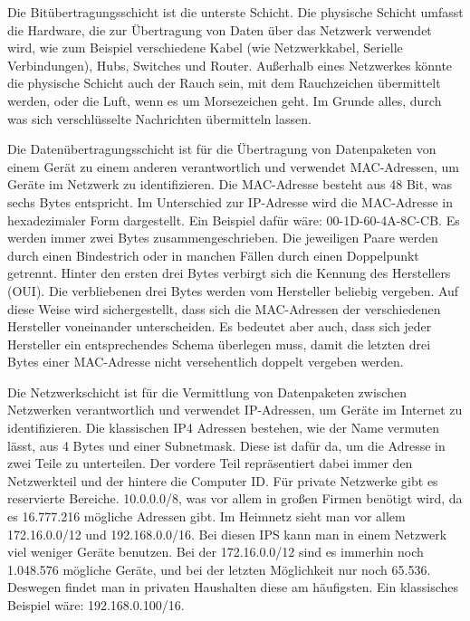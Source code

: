 \begin{compactenum} 
    \item Die Bitübertragungsschicht ist die unterste Schicht. Die physische Schicht umfasst die Hardware, die zur Übertragung von Daten über das Netzwerk verwendet wird, wie zum Beispiel verschiedene Kabel (wie Netzwerkkabel, Serielle Verbindungen), Hubs, Switches und Router. Außerhalb eines Netzwerkes könnte die physische Schicht auch der Rauch sein, mit dem Rauchzeichen übermittelt werden, oder die Luft, wenn es um Morsezeichen geht. Im Grunde alles, durch was sich verschlüsselte Nachrichten übermitteln lassen.  
    \item Die Datenübertragungsschicht ist für die Übertragung von Datenpaketen von einem Gerät zu einem anderen verantwortlich und verwendet MAC-Adressen, um Geräte im Netzwerk zu identifizieren. \cite{macAddress} Die MAC-Adresse besteht aus 48 Bit, was sechs Bytes entspricht. Im Unterschied zur IP-Adresse wird die MAC-Adresse in hexadezimaler Form dargestellt. Ein Beispiel dafür wäre: 00-1D-60-4A-8C-CB. Es werden immer zwei Bytes zusammengeschrieben. Die jeweiligen Paare werden durch einen Bindestrich oder in manchen Fällen durch einen Doppelpunkt getrennt. Hinter den ersten drei Bytes verbirgt sich die Kennung des Herstellers (OUI). Die verbliebenen drei Bytes werden vom Hersteller beliebig vergeben. Auf diese Weise wird sichergestellt, dass sich die MAC-Adressen der verschiedenen Hersteller voneinander unterscheiden. Es bedeutet aber auch, dass sich jeder Hersteller ein entsprechendes Schema überlegen muss, damit die letzten drei Bytes einer MAC-Adresse nicht versehentlich doppelt vergeben werden.   
    \item Die Netzwerkschicht ist für die Vermittlung von Datenpaketen zwischen Netzwerken verantwortlich und verwendet IP-Adressen, um Geräte im Internet zu identifizieren. \cite{ipAddress} Die klassischen IP4 Adressen bestehen, wie der Name vermuten lässt, aus 4 Bytes und einer Subnetmask. Diese ist dafür da, um die Adresse in zwei Teile zu unterteilen. Der vordere Teil repräsentiert dabei immer den Netzwerkteil und der hintere die Computer ID. Für private Netzwerke gibt es reservierte Bereiche. 10.0.0.0/8, was vor allem in großen Firmen benötigt wird, da es 16.777.216 mögliche Adressen gibt. Im Heimnetz sieht man vor allem 172.16.0.0/12 und 192.168.0.0/16. Bei diesen IPS kann man in einem Netzwerk viel weniger Geräte benutzen. Bei der 172.16.0.0/12 sind es immerhin noch 1.048.576 mögliche Geräte, und bei der letzten Möglichkeit nur noch 65.536. Deswegen findet man in privaten Haushalten diese am häufigsten. Ein klassisches Beispiel wäre: 192.168.0.100/16.   

\end{compactenum}
